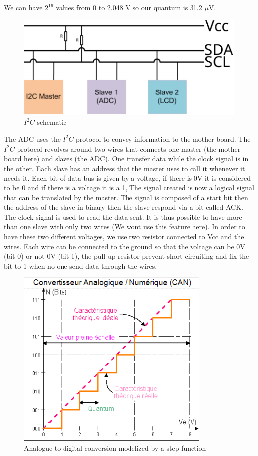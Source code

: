 \documentclass{article}[12pt]
\begin{document}
We can have $2^{16}$ values from 0 to 2.048 V so our quantum is 31.2 $\mu$V.
\begin{figure}[H]
    \centering
    \includegraphics[width=\textwidth]{figures/i2c_diagram.pdf}
    \caption{$I^2C$ schematic}
    \label{fig:i2c_diagram}
\end{figure}
The ADC uses the $I^2C$ protocol to convey information to the mother board. 
The $I^2C$ protocol revolves around two wires that connects one master (the mother board here) and slaves (the ADC). 
One transfer data while the clock signal is in the other.
Each slave has an address that the master uses to call it whenever it needs it.
Each bit of data bus is given by a voltage, if there is 0V it is considered to be 0 and if there is a voltage it is a 1,
The signal created is now a logical signal that can be translated by the master.
The signal is composed of a start bit then the address of the slave in binary then the slave respond via a bit called ACK.
The clock signal is used to read the data sent.
It is thus possible to have more than one slave with only two wires (We wont use this feature here).
In order to have these two different voltages, we use two resistor connected to Vcc and the wires.
Each wire can be connected to the ground so that the voltage can be 0V (bit 0) or not 0V (bit 1), the pull up resistor prevent short-circuiting and fix the bit to 1 when no one send data through the wires.
\begin{figure}[H]
    \centering
    \includegraphics[width=.4\textwidth]{figures/CAN.png}
    \caption{Analogue to digital conversion modelized by a step function}
    \label{fig:CAN_step}
\end{figure}
\end{document}
